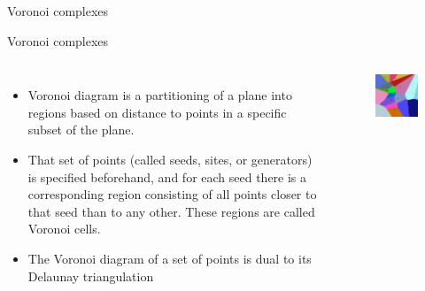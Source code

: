 \begin{frame}{Voronoi complexes}
    
\end{frame}
\begin{frame}{Voronoi complexes}
    \begin{columns}
        \begin{itemize}
            \item  Voronoi diagram is a partitioning of a plane into regions based on distance
to points in a specific subset of the plane.
            \item
That set of points (called seeds, sites, or generators) is specified beforehand,
and for each seed there is a corresponding region consisting of all points
closer to that seed than to any other.  These regions are called Voronoi cells.
            \item
The Voronoi diagram of a set of points is dual to its Delaunay triangulation   
            
        \end{itemize}


        \begin{figure}
            \centering
            \includegraphics[width=\textwidth]{figs/L07-voronoi.jpg}
        \end{figure}
    \end{columns}
\end{frame}


